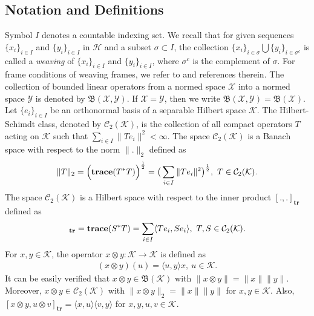 \documentclass[reqno]{amsart}
\theoremstyle{plain}
\theoremstyle{remark}
\numberwithin{equation}{section}
\begin{document}
\subsection{Notation and Definitions}\label{sec2}
Symbol $I$ denotes a countable indexing set. We recall that for given sequences  $\{x_i\}_{i \in I}$ and $\{y_i\}_{i \in I}$ in $\mathcal{H}$ and a subset $\sigma \subset I$, the collection  $\{x_i\}_{i \in \sigma} \bigcup \{y_i\}_{i \in \sigma^{c}}$ is called a \emph{weaving} of $\{x_i\}_{i \in I}$ and $\{y_i\}_{i \in I}$, where $\sigma^{c}$ is the complement of $\sigma$. For frame conditions of weaving frames, we refer to \cite{DVV17} and references therein.  The collection of bounded linear operators from a normed space $\mathcal{X}$ into a normed space $\mathcal{Y}$ is denoted by  $\mathfrak{B}(\mathcal{X}, \mathcal{Y})$.  If $\mathcal{X}=\mathcal{Y}$, then we write $\mathfrak{B}(\mathcal{X}, \mathcal{Y})= \mathfrak{B}(\mathcal{X})$.  Let $\{e_i\}_{i \in I}$ be  an orthonormal basis of a separable Hilbert space $\mathcal{K}$. The Hilbert-Schimdt class, denoted by $\mathcal{C}_2(\mathcal{K})$, is the collection of all compact operators $T$ acting on $\mathcal{K}$ such that $\sum_{i \in I} \|Te_i\|^2 < \infty$. The space $\mathcal{C}_2(\mathcal{K})$ is a Banach space with respect to the norm $\|.\|_2$ defined as
\begin{align*}
\|T\|_2= \Big(\text{\textbf{trace}}(T^* T)\Big)^\frac{1}{2} =\big(\sum\limits_{i \in I} \| Te_i\|^2\big)^\frac{1}{2}, \ T \in \mathcal{C}_2(\mathcal{K}).
\end{align*}
 The space $\mathcal{C}_2(\mathcal{K})$ is a Hilbert space with respect to the inner product $[ .,. ]_{\textbf{tr}}$ defined as
\begin{align*}
[ T, S ]_{\textbf{tr}}= \text{\textbf{trace}}(S^* T)=\sum_{i \in I} \langle T e_i, S e_i \rangle , \ T, S \in \mathcal{C}_2(\mathcal{K}).
\end{align*}
For  $ x, y \in \mathcal{K}$, the operator $x \otimes y : \mathcal{K} \rightarrow \mathcal{K}$ is defined as
\begin{align*}
(x \otimes y )(u)= \langle u, y \rangle x, \ u \in \mathcal{K}.
\end{align*}
It can be easily verified that $x \otimes y \in \mathfrak{B}(\mathcal{K})$ with $\|x \otimes y\|= \|x\|\|y\|$. Moreover, $x \otimes y \in \mathcal{C}_2(\mathcal{K})$ with $\|x \otimes y\|_2= \|x\|\|y\|$ for $ x, y \in \mathcal{K}$. Also, $[ x \otimes y, u \otimes v ]_{\textbf{tr}}=\langle x, u \rangle \langle v, y \rangle$ for $ x, y, u, v \in \mathcal{K}$.
\end{document}
